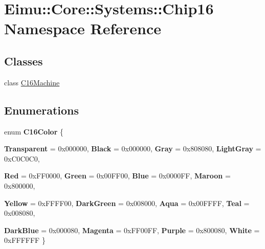 \hypertarget{namespace_eimu_1_1_core_1_1_systems_1_1_chip16}{
\section{Eimu::Core::Systems::Chip16 Namespace Reference}
\label{namespace_eimu_1_1_core_1_1_systems_1_1_chip16}
}
\subsection*{Classes}
\begin{DoxyCompactItemize}
\item 
class \hyperlink{class_eimu_1_1_core_1_1_systems_1_1_chip16_1_1_c16_machine}{C16Machine}
\end{DoxyCompactItemize}
\subsection*{Enumerations}
\begin{DoxyCompactItemize}
\item 
enum {\bfseries C16Color} \{ \par
{\bfseries Transparent} =  0x000000, 
{\bfseries Black} =  0x000000, 
{\bfseries Gray} =  0x808080, 
{\bfseries LightGray} = 0xC0C0C0, 
\par
{\bfseries Red} =  0xFF0000, 
{\bfseries Green} =  0x00FF00, 
{\bfseries Blue} =  0x0000FF, 
{\bfseries Maroon} =  0x800000, 
\par
{\bfseries Yellow} =  0xFFFF00, 
{\bfseries DarkGreen} =  0x008000, 
{\bfseries Aqua} =  0x00FFFF, 
{\bfseries Teal} =  0x008080, 
\par
{\bfseries DarkBlue} =  0x000080, 
{\bfseries Magenta} =  0xFF00FF, 
{\bfseries Purple} =  0x800080, 
{\bfseries White} =  0xFFFFFF
 \}
\end{DoxyCompactItemize}
